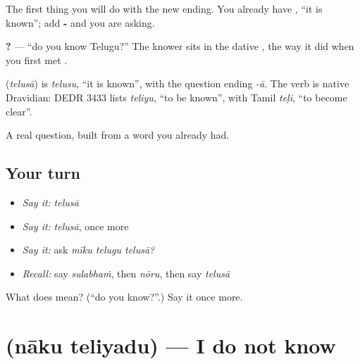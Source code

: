 The first thing you will do with the new ending. You already have \textbf{}, \textquotedblleft{}it is known\textquotedblright{}; add \textbf{-} and you are asking.

\textbf{  ?} — \textquotedblleft{}do you know Telugu?\textquotedblright{} The knower sits in the dative , the way it did when you first met .

\begin{cousinweb}
\textbf{} (\emph{telusā}) is \emph{telusu}, \textquotedblleft{}it is known\textquotedblright{}, with the question ending \emph{-ā}. The verb is native Dravidian: DEDR 3433 lists \emph{teliyu}, \textquotedblleft{}to be known\textquotedblright{}, with Tamil \emph{teḷi}, \textquotedblleft{}to become clear\textquotedblright{}.
\end{cousinweb}

\begin{grammarlens}[title={What you've built}]
A real question, built from a word you already had.
\end{grammarlens}

\subsection*{Your turn}
\begin{itemize}
\raggedright
  \item \emph{Say it:} \emph{telusā}
  \item \emph{Say it:} \emph{telusā}, once more
  \item \emph{Say it:} ask \emph{mīku telugu telusā?}
  \item \emph{Recall:} say \emph{sulabhaṁ}, then \emph{nōru}, then say \emph{telusā}
\end{itemize}

\begin{tcolorbox}[breakable,colback=teal!4,colframe=teal!35!black,title={Before you move on}]
What does  mean? (\textquotedblleft{}do you know?\textquotedblright{}.) Say it once more.
\end{tcolorbox}
\section[\texorpdfstring{\te{నాకు} \te{తెలియదు} (nāku teliyadu)}{నాకు తెలియదు (nāku teliyadu)}]{  (nāku teliyadu) — I do not know}

\label{lesson:TE-C78-dontknow}



